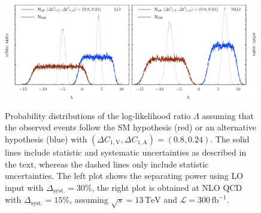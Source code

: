 \documentclass[preprint]{JHEP3}
\newcommand{\TeV}{\mathrm{TeV}}
\newcommand{\SM}{\mathrm{SM}}
\newcommand{\alt}{\mathrm{alt}}
\def\invfb {\mathrm{fb}^{-1}}
\def\DConeA{\Delta C_{1,\mathrm{A}}}
\def\DConeV{\Delta C_{1,\mathrm{V}}}
\def\HSM{\mathcal{H}_{\mathrm{SM}}}
\def\Halt{\mathcal{H}_{\mathrm{alt}}}
\newcommand{\be}{\begin{eqnarray}}
\newcommand{\ee}{\end{eqnarray}}
\begin{document}
\begin{figure}[t]
\centering %
\includegraphics[width=0.49\textwidth]{./LogLikelihoods_LO.eps}
\hfill
\includegraphics[width=0.49\textwidth]{./LogLikelihoods_NLO.eps}
\caption{\label{fig:vii}
Probability distributions of the log-likelihood ratio $\Lambda$ assuming that the observed events follow the SM hypothesis (red) or an alternative hypothesis (blue) 
with $(\DConeV,\DConeA)=(0.8,0.24)$.
The solid lines include statistic and systematic uncertainties as described in the text, whereas the dashed lines only include statistic uncertainties.
The left plot shows the separating power using LO input with $\Delta_\mathrm{syst.}=30\%$, 
the right plot is obtained at NLO QCD with $\Delta_\mathrm{syst.}=15\%$, assuming $\sqrt{s}=13\,\TeV$ and $\mathcal{L}=300\,\invfb$.
}
\end{figure}
\end{document}

